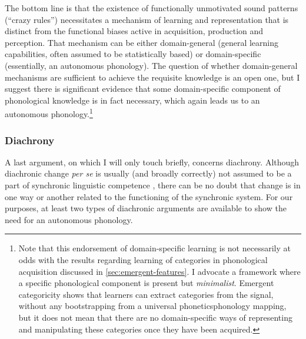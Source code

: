The bottom line is that the existence of functionally unmotivated sound patterns (\enquote{crazy rules}) necessitates a mechanism of learning and representation that is distinct from the functional biases active in acquisition, production and perception. That mechanism can be either domain\hyp general (\eg general learning capabilities, often assumed to be statistically based) or domain\hyp specific (essentially, an autonomous phonology). The question of whether domain\hyp general mechanisms are sufficient to achieve the requisite knowledge is an open one, but I suggest there is significant evidence that some domain\hyp specific component of phonological knowledge is in fact necessary, which again leads us to an autonomous phonology.\footnote{Note that this endorsement of domain\hyp specific learning is not necessarily at odds with the results regarding learning of categories in phonological acquisition discussed in \cref{sec:emergent-features}. I advocate a framework where a specific phonological component is present but \emph{minimalist}. Emergent categoricity shows that learners can extract categories from the signal, without any bootstrapping from a universal phonetics\endash phonology mapping, but it does not mean that there are no domain\hyp specific ways of representing and manipulating these categories once they have been acquired.}

\subsubsection{Diachrony}
\label{sec:diachrony}

A last argument, on which I will only touch briefly, concerns diachrony. Although diachronic change \emph{per se} is usually (and broadly correctly) not assumed to be a part of synchronic linguistic competence \citep[\cf especially][]{hale03:_neogr,hale07:_histor}, there can be no doubt that change is in one way or another related to the functioning of the synchronic system. For our purposes, at least two types of diachronic arguments are available to show the need for an autonomous phonology.

